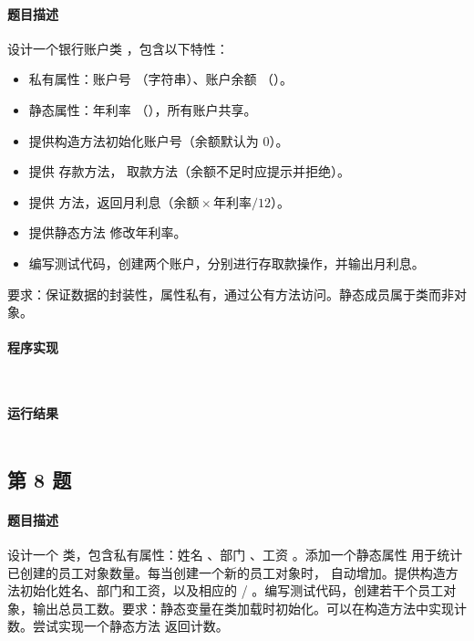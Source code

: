 \documentclass{academics}
\begin{document}
\paragraph{题目描述} {
    设计一个银行账户类 ，包含以下特性：
    \begin{itemize}
        \item 私有属性：账户号 （字符串）、账户余额 （）。
        \item 静态属性：年利率 （），所有账户共享。
        \item 提供构造方法初始化账户号（余额默认为 $0$）。
        \item 提供  存款方法， 取款方法（余额不足时应提示并拒绝）。
        \item 提供  方法，返回月利息（$\text{余额}\times\text{年利率}/12$）。
        \item 提供静态方法  修改年利率。
        \item 编写测试代码，创建两个账户，分别进行存取款操作，并输出月利息。
    \end{itemize}
    要求：保证数据的封装性，属性私有，通过公有方法访问。静态成员属于类而非对象。
}

\paragraph{程序实现} {
    \inputminted[label=BankAccount.java]{java}{../src/P07/BankAccount.java}
    \inputminted[label=Main.java]{java}{../src/P07/Main.java}
}

\paragraph{运行结果} {
    \inputminted{text}{../res/P07.out}
}

\subsection{第 8 题}

\paragraph{题目描述} {
    设计一个  类，包含私有属性：姓名 、部门 、工资 。添加一个静态属性  用于统计已创建的员工对象数量。每当创建一个新的员工对象时， 自动增加。提供构造方法初始化姓名、部门和工资，以及相应的  / 。编写测试代码，创建若干个员工对象，输出总员工数。要求：静态变量在类加载时初始化。可以在构造方法中实现计数。尝试实现一个静态方法  返回计数。
}
\end{document}
